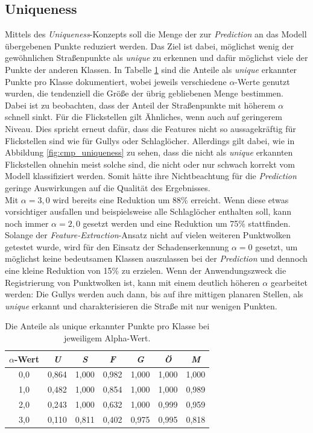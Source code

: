 \subsection{Uniqueness}

Mittels des \textit{Uniqueness}-Konzepts soll die Menge der zur \textit{Prediction} an das Modell übergebenen Punkte reduziert werden. Das Ziel ist dabei, möglichst wenig der gewöhnlichen Straßenpunkte als \textit{unique} zu erkennen und dafür möglichst viele der Punkte der anderen Klassen. In Tabelle \ref{table:alphas} sind die Anteile als \textit{unique} erkannter Punkte pro Klasse dokumentiert, wobei jeweils verschiedene $\alpha$-Werte genutzt wurden, die tendenziell die Größe der übrig gebliebenen Menge bestimmen. \\
Dabei ist zu beobachten, dass der Anteil der Straßenpunkte mit höherem $\alpha$ schnell sinkt. Für die Flickstellen gilt Ähnliches, wenn auch auf geringerem Niveau. Dies spricht erneut dafür, dass die Features nicht so aussagekräftig für Flickstellen sind wie für Gullys oder Schlaglöcher. Allerdings gilt dabei, wie in Abbildung \ref{fig:cmp_uniqueness} zu sehen, dass die nicht als \textit{unique} erkannten Flickstellen ohnehin meist solche sind, die nicht oder nur schwach korrekt vom Modell klassifiziert werden. Somit hätte ihre Nichtbeachtung für die \textit{Prediction} geringe Auswirkungen auf die Qualität des Ergebnisses. \\
Mit $\alpha = 3,0$ wird bereits eine Reduktion um 88\% erreicht. Wenn diese etwas vorsichtiger ausfallen und beispielsweise alle Schlaglöcher enthalten soll, kann noch immer $\alpha = 2,0$ gesetzt werden und eine Reduktion um 75\% stattfinden. Solange der \textit{Feature-Extraction}-Ansatz nicht auf vielen weiteren Punktwolken getestet wurde, wird für den Einsatz der Schadenserkennung $\alpha = 0$ gesetzt, um möglichst keine bedeutsamen Klassen auszulassen bei der \textit{Prediction} und dennoch eine kleine Reduktion von 15\% zu erzielen. Wenn der Anwendungszweck die Registrierung von Punktwolken ist, kann mit einem deutlich höheren $\alpha$ gearbeitet werden: Die Gullys werden auch dann, bis auf ihre mittigen planaren Stellen, als \textit{unique} erkannt und charakterisieren die Straße mit nur wenigen Punkten.

\begin{table}
\centering
\begin{tabular}{c|c|c|c|c|c|c}
$\alpha$-Wert & \textit{U} & \textit{S} & \textit{F} & \textit{G} & \textit{Ö} & \textit{M} \\
\hline
0,0 & 0,864 & 1,000 & 0,982 & 1,000 & 1,000 & 1,000 \\
1,0 & 0,482 & 1,000 & 0,854 & 1,000 & 1,000 & 0,989 \\
2,0 & 0,243 & 1,000 & 0,632 & 1,000 & 0,999 & 0,959 \\
3,0 & 0,110 & 0,811 & 0,402 & 0,975 & 0,995 & 0,818 \\
\end{tabular}
\caption{Die Anteile als unique erkannter Punkte pro Klasse bei jeweiligem Alpha-Wert.}
\label{table:alphas}
\end{table}

